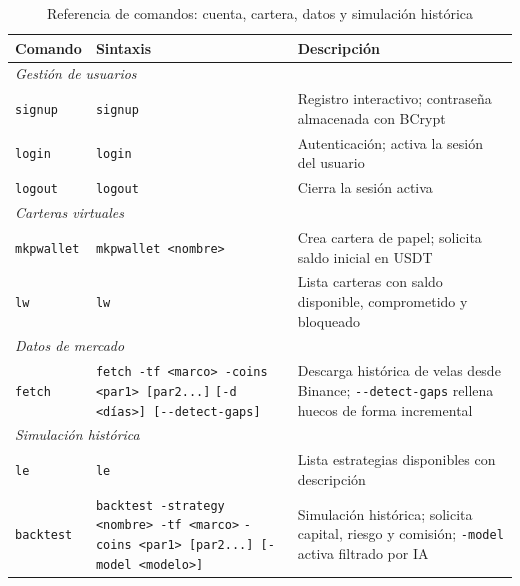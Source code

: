 \begin{table}[H]
    \centering
    \caption{Referencia de comandos: cuenta, cartera, datos y simulación histórica}
    \label{tab:comandos_a}
    \begin{tabular}{p{2.0cm} p{6.0cm} p{4.6cm}}
    \hline
    \textbf{Comando} & \textbf{Sintaxis} & \textbf{Descripción} \\
    \hline
    \multicolumn{3}{l}{\textit{Gestión de usuarios}} \\
    \hline
    \texttt{signup}   & \texttt{signup}
                      & Registro interactivo; contraseña almacenada con BCrypt \\
    \texttt{login}    & \texttt{login}
                      & Autenticación; activa la sesión del usuario \\
    \texttt{logout}   & \texttt{logout}
                      & Cierra la sesión activa \\
    \hline
    \multicolumn{3}{l}{\textit{Carteras virtuales}} \\
    \hline
    \texttt{mkpwallet} & \texttt{mkpwallet <nombre>}
                       & Crea cartera de papel; solicita saldo inicial en USDT \\
    \texttt{lw}        & \texttt{lw}
                       & Lista carteras con saldo disponible, comprometido y bloqueado \\
    \hline
    \multicolumn{3}{l}{\textit{Datos de mercado}} \\
    \hline
    \texttt{fetch} & \texttt{fetch -tf <marco> -coins <par1> [par2...]} \newline
                     \texttt{[-d <días>] [{-}{-}detect-gaps]}
                   & Descarga histórica de velas desde Binance; \texttt{-{}-detect-gaps}
                     rellena huecos de forma incremental \\
    \hline
    \multicolumn{3}{l}{\textit{Simulación histórica}} \\
    \hline
    \texttt{le}       & \texttt{le}
                      & Lista estrategias disponibles con descripción \\
    \texttt{backtest} & \texttt{backtest -strategy <nombre> -tf <marco>} \newline
                        \texttt{-coins <par1> [par2...] [-model <modelo>]}
                      & Simulación histórica; solicita capital, riesgo y comisión;
                        \texttt{-model} activa filtrado por IA \\
    \hline
    \end{tabular}
\end{table}

